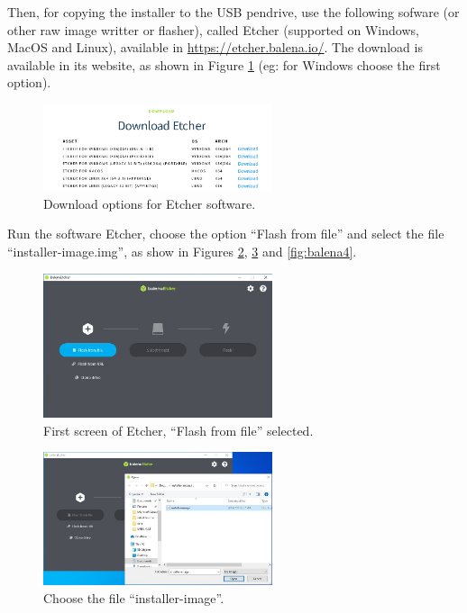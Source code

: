 \documentclass[11pt,a4paper]{article}
\begin{document}
Then, for copying the installer to the USB pendrive, use the following sofware (or other raw image writter or flasher), called
Etcher (supported on Windows, MacOS and Linux), available in \url{https://etcher.balena.io/}. The download is available in its website,
as shown in Figure \ref{fig:balena1} (eg: for Windows choose the first option).

\begin{figure}[H]
  \centering
  \includegraphics[width=0.6\textwidth]{pictures/balena-1.png}
  \caption{Download options for Etcher software.}
  \label{fig:balena1}
\end{figure}

Run the software Etcher, choose the option ``Flash from file'' and select the file ``installer-image.img'', as show in Figures \ref{fig:balena2}, \ref{fig:balena3} and \ref{fig:balena4}.

\begin{figure}[H]
  \centering
  \includegraphics[width=0.6\textwidth]{pictures/balena-2-ed.jpg}
  \caption{First screen of Etcher, ``Flash from file'' selected.}
  \label{fig:balena2}
\end{figure}

\begin{figure}[H]
  \centering
  \includegraphics[width=0.6\textwidth]{pictures/balena-3-ed.jpg}
  \caption{Choose the file ``installer-image''.}
  \label{fig:balena3}
\end{figure}
\end{document}
